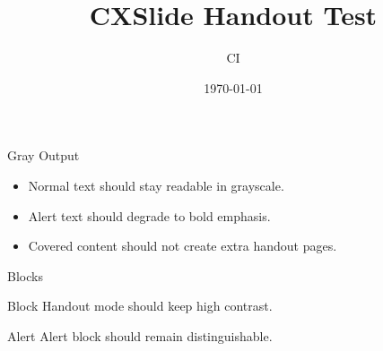\documentclass[aspectratio=169, UTF8, handout]{ctexbeamer}
\title{CXSlide Handout Test}
\author{CI}
\date{\today}
\begin{document}
\begin{frame}
  \titlepage
\end{frame}

\begin{frame}{Gray Output}
  \begin{itemize}
    \item Normal text should stay readable in grayscale.
    \item \alert{Alert text} should degrade to bold emphasis.
    \item Covered content should not create extra handout pages.
  \end{itemize}
\end{frame}

\begin{frame}{Blocks}
  \begin{block}{Block}
    Handout mode should keep high contrast.
  \end{block}
  \begin{alertblock}{Alert}
    Alert block should remain distinguishable.
  \end{alertblock}
\end{frame}
\end{document}
